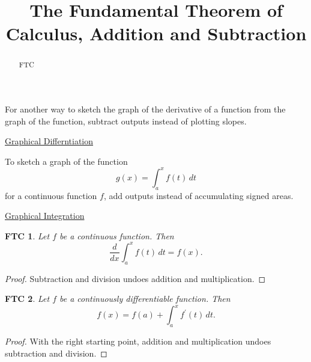 \documentclass{ximera}
\title{The Fundamental Theorem of Calculus, Addition and Subtraction}
\newtheorem{theorem87}{FTC}
\begin{document}
\begin{abstract}
FTC
\end{abstract}
\maketitle


\begin{exploration} \label{QPf4nxEFVVD}
For another way to sketch the graph of the derivative of a function from the graph of the function, subtract outputs instead of plotting slopes. 
 

\begin{onlineOnly}
    \begin{center}
\end{center}
\end{onlineOnly}

\href{https://www.desmos.com/calculatorom47jl8m5t}{Graphical Differntiation}

\end{exploration}




\begin{exploration} \label{QPfe4nxEFVVD}

To sketch a graph of the function
\[
 g(x) = \int_a^x f(t)\, dt
\]
for a continuous function $f$, add outputs instead of accumulating signed areas.

\begin{onlineOnly}
    \begin{center}
\end{center}
\end{onlineOnly}

\href{https://www.desmos.com/calculator/anp4kxvozn}{Graphical Integration}

\begin{theorem87}
Let $f$ be a continuous function. Then
\[
   \frac{d}{dx} \int_a^x f(t)\, dt = f(x).
\]
\end{theorem87}
\begin{proof}
Subtraction and division undoes addition and multiplication.
\end{proof}

\begin{theorem87}
Let $f$ be a continuously differentiable function. Then
\[
   f(x) =  f(a) + \int_a^x f^\prime(t)\, dt .
\]
\end{theorem87}
\begin{proof}
With the right starting point, addition and multiplication undoes subtraction and division.
\end{proof}


\end{exploration}
\end{document}
